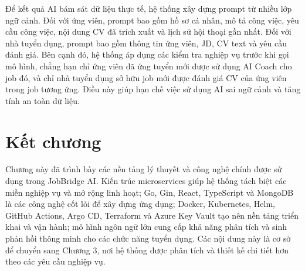 \documentclass[../DoAn.tex]{subfiles}
\begin{document}
Để kết quả AI bám sát dữ liệu thực tế, hệ thống xây dựng prompt từ nhiều lớp ngữ cảnh. Đối với ứng viên, prompt bao gồm hồ sơ cá nhân, mô tả công việc, yêu cầu công việc, nội dung CV đã trích xuất và lịch sử hội thoại gần nhất. Đối với nhà tuyển dụng, prompt bao gồm thông tin ứng viên, JD, CV text và yêu cầu đánh giá. Bên cạnh đó, hệ thống áp dụng các kiểm tra nghiệp vụ trước khi gọi mô hình, chẳng hạn chỉ ứng viên đã ứng tuyển mới được sử dụng AI Coach cho job đó, và chỉ nhà tuyển dụng sở hữu job mới được đánh giá CV của ứng viên trong job tương ứng. Điều này giúp hạn chế việc sử dụng AI sai ngữ cảnh và tăng tính an toàn dữ liệu.

\section{Kết chương}
Chương này đã trình bày các nền tảng lý thuyết và công nghệ chính được sử dụng trong JobBridge AI. Kiến trúc microservices giúp hệ thống tách biệt các miền nghiệp vụ và mở rộng linh hoạt; Go, Gin, React, TypeScript và MongoDB là các công nghệ cốt lõi để xây dựng ứng dụng; Docker, Kubernetes, Helm, GitHub Actions, Argo CD, Terraform và Azure Key Vault tạo nên nền tảng triển khai và vận hành; mô hình ngôn ngữ lớn cung cấp khả năng phân tích và sinh phản hồi thông minh cho các chức năng tuyển dụng. Các nội dung này là cơ sở để chuyển sang Chương 3, nơi hệ thống được phân tích và thiết kế chi tiết hơn theo các yêu cầu nghiệp vụ.
\end{document}
